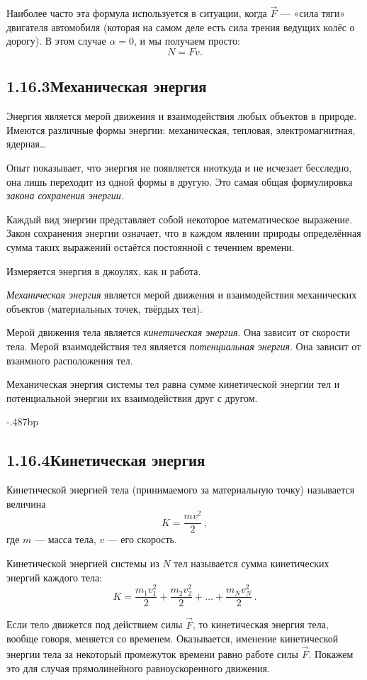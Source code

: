 Наиболее часто эта формула используется в ситуации, когда $\vec F$ — «сила тяги» двигателя автомобиля (которая на самом деле есть сила трения ведущих колёс о дорогу). В этом случае $\alpha=0$, и мы получаем просто:
$$N=Fv.$$
\newpage
\subsection*{1.16.3\quad Механическая энергия}
Энергия является мерой движе\-ния и взаимодействия любых объектов в природе. Имеются различные формы энер\-гии: механиче\-ская, тепловая, электромагнитная, ядерная\ldots

Опыт показывает, что энергия не появляется ниоткуда и не исчезает бесследно, она лишь переходит из одной формы в другую. Это самая общая формулировка \textit{закона со\-хране\-ния энер\-гии.}

Каждый вид энер\-гии представляет собой некоторое математическое выражение. Закон со\-хране\-ния энер\-гии означает, что в каждом явлении природы определённая сумма таких выра\-жений остаётся постоянной с течением времени.

Измеряется энергия в джоулях, как и работа.

\textit{Механическая энергия} является мерой движе\-ния и взаимодействия механических объектов (материальных точек, твёрдых тел).

Мерой движе\-ния тела является \textit{кинетическая энергия}. Она зависит от скорости тела. Мерой взаимодействия тел является \textit{потенциаль\-ная энергия}. Она зависит от взаимного расположения тел.

Механическая энергия си\-стемы тел равна сумме кинетической энер\-гии тел и потенциаль\-ной энер\-гии их взаимодействия друг с другом.

\kern-.487bp\relax
\subsection*{1.16.4\quad Кинетическая энергия}
Кинетической энергией тела (принимаемого за материальную точку) называется величина
\vskip-2.801bp\relax
$$K=\frac{mv^2}{2}\,,$$
\vskip2.181bp\relax
\noindent где $m$ — масса тела, $v$ — его скорость.

Кинетической энергией си\-стемы из $N$ тел называется сумма кинетических энергий каждого тела:
$$K=\frac{m_1v_1^2}{2}+\frac{m_2v_2^2}{2}+\ldots+\frac{m_Nv_N^2}{2}\,.$$
\vskip-1.413bp\relax

Если тело движется под действием силы $\vec F$, то кинетическая энергия тела, вообще гово\-ря, ме\-няется со временем. Оказывается, именение кинетической энер\-гии тела за некоторый промежуток времени равно работе силы $\vec F$. Покажем это для случая прямолинейного равно\-ускоренного движе\-ния.

